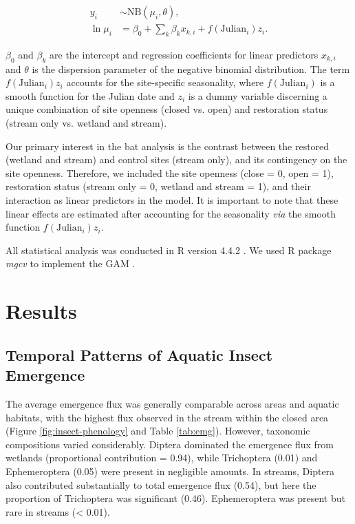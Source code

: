 \documentclass[11pt, class=article, crop=false]{standalone}
\begin{document}
\begin{align}
    y_i &\sim \mbox{NB}(\mu_i, \theta), \nonumber\\
    \ln \mu_i &= \beta_0 + \sum_k \beta_k x_{k,i} + f(\mbox{Julian}_i)z_i.
\end{align}

$\beta_0$ and $\beta_k$ are the intercept and regression coefficients for linear predictors $x_{k,i}$ and $\theta$ is the dispersion parameter of the negative binomial distribution.
The term $f(\mbox{Julian}_i)z_i$ accounts for the site-specific seasonality, where $f(\mbox{Julian}_i)$ is a smooth function for the Julian date and $z_i$ is a dummy variable discerning a unique combination of site openness (closed vs. open) and restoration status (stream only vs. wetland and stream).

Our primary interest in the bat analysis is the contrast between the restored (wetland and stream) and control sites (stream only), and its contingency on the site openness.
Therefore, we included the site openness (close = 0, open = 1), restoration status (stream only = 0, wetland and stream = 1), and their interaction as linear predictors in the model.
It is important to note that these linear effects are estimated after accounting for the seasonality \textit{via} the smooth function $f(\mbox{Julian}_i)z_i$.

All statistical analysis was conducted in R version 4.4.2 \citep{r_core_team_r_2024}. We used R package \textit{mgcv} to implement the GAM \citep{wood_fast_2011}.

\newpage

\section{Results}

\subsection{Temporal Patterns of Aquatic Insect Emergence}

The average emergence flux was generally comparable across areas and aquatic habitats, with the highest flux observed in the stream within the closed area (Figure \ref{fig:insect-phenology} and Table \ref{tab:emg}).
However, taxonomic compositions varied considerably.
Diptera dominated the emergence flux from wetlands (proportional contribution = 0.94), while Trichoptera (0.01) and Ephemeroptera (0.05) were present in negligible amounts.
In streams, Diptera also contributed substantially to total emergence flux (0.54), but here the proportion of Trichoptera was significant (0.46).
Ephemeroptera was present but rare in streams (< 0.01).
\end{document}

